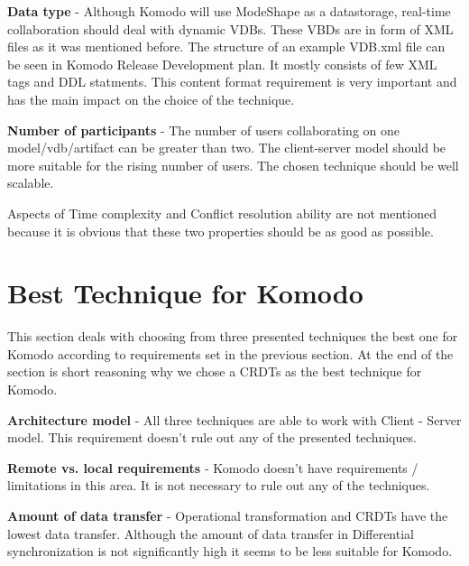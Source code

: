 \documentclass[12pt,oneside]{fithesis2}
\begin{document}
\textbf{Data type} - Although Komodo will use ModeShape as a datastorage, real-time collaboration should deal with dynamic VDBs. These VBDs are in form of XML files as it was mentioned before. The structure of an example VDB.xml file can be seen in Komodo Release Development plan\cite{Komodo}. It mostly consists of few XML tags and DDL statments. This content format requirement is very important and has the main impact on the choice of the technique.

\vspace{3mm} 

\textbf{Number of participants} - The number of users collaborating on one model/vdb/artifact can be greater than two. The client-server model should be more suitable for the rising number of users. The chosen technique should be well scalable.

\vspace{3mm} 

\par Aspects of Time complexity and Conflict resolution ability are not mentioned because it is obvious that these two properties should be as good as possible.
\section{Best Technique for Komodo} \label{best}
\par This section deals with choosing from three presented techniques the best one for Komodo according to requirements set in the previous section. At the end of the section is short reasoning why we chose a CRDTs as the best technique for Komodo. 

\vspace{3mm} 

\textbf{Architecture model} - All three techniques are able to work with Client - Server model. This requirement doesn't rule out any of the presented techniques.

\vspace{3mm} 

\textbf{Remote vs. local requirements} - Komodo doesn't have requirements / limitations in this area. It is not necessary to rule out any of the techniques.

\vspace{3mm} 

\textbf{Amount of data transfer} - Operational transformation and CRDTs have the lowest data transfer. Although the amount of data transfer in Differential synchronization is not significantly high it seems to be less suitable for Komodo.	
\end{document}

